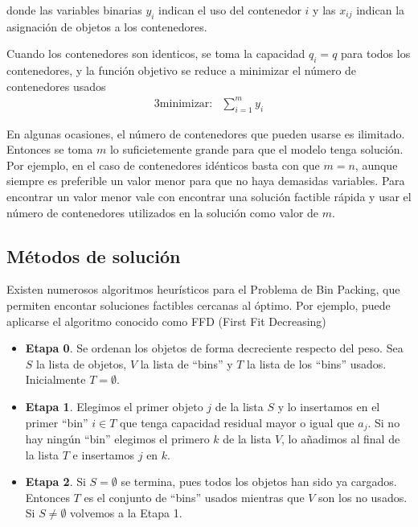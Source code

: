 \noindent donde las variables binarias $y_i$ indican el uso del contenedor $i$ y las $x_{ij}$ indican la asignación de objetos
a los contenedores.

Cuando los contenedores son identicos, se toma la capacidad $q_i=q$ para todos los contenedores, y la función objetivo se 
reduce a minimizar el número de contenedores usados
\begin{alignat}{3}
    \text{minimizar:}   &   \sum_{i=1}^m y_{i}
\end{alignat}

\newpage

En algunas ocasiones, el número de contenedores que pueden usarse es ilimitado. Entonces se toma $m$ lo suficietemente grande
para que el modelo tenga solución. Por ejemplo, en el caso de contenedores idénticos basta con que $m=n$, aunque siempre es
preferible un valor menor para que no haya demasidas variables. Para encontrar un valor menor vale con encontrar una solución
factible rápida y usar el número de contenedores utilizados en la solución como valor de $m$.

\subsection{Métodos de solución}

Existen numerosos algoritmos heurísticos para el Problema de Bin Packing, que permiten encontar soluciones factibles cercanas
al óptimo. Por ejemplo, puede aplicarse el algoritmo conocido como FFD (First Fit Decreasing)

\begin{itemize}
    \item \textbf{Etapa 0}. Se ordenan los objetos de forma decreciente respecto del peso. Sea $S$ la lista de objetos, $V$
    la lista de ``bins'' y $T$ la lista de los ``bins'' usados. Inicialmente $T=\emptyset$.
    \item \textbf{Etapa 1}. Elegimos el primer objeto $j$ de la lista $S$ y lo insertamos en el primer ``bin'' $i\in T$ que
    tenga capacidad residual mayor o igual que $a_j$. Si no hay ningún ``bin'' elegimos el primero $k$ de la lista $V$, lo
    añadimos al final de la lista $T$ e insertamos $j$ en $k$.
    \item \textbf{Etapa 2}. Si $S=\emptyset$ se termina, pues todos los objetos han sido ya cargados. Entonces $T$ es el
    conjunto de ``bins'' usados mientras que $V$ son los no usados. Si $S\neq\emptyset$ volvemos a la Etapa 1.
\end{itemize}

